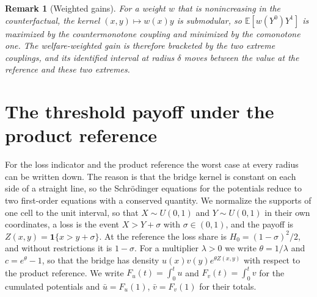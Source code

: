 \documentclass[11pt,a4paper]{article}
\theoremstyle{notesplain}
\theoremstyle{notesupright}
\newtheorem{remark}[theorem]{Remark}
\numberwithin{equation}{section}
\newcommand{\E}{\mathbb{E}}
\begin{document}
\begin{remark}[Weighted gains]
For a weight $w$ that is nonincreasing in the counterfactual, the kernel $(x,y)\mapsto w(x)y$ is submodular, so $\E[w(Y^0)Y^1]$ is maximized by the countermonotone coupling and minimized by the comonotone one. The welfare-weighted gain is therefore bracketed by the two extreme couplings, and its identified interval at radius $\delta$ moves between the value at the reference and these two extremes.
\end{remark}

\section{The threshold payoff under the product reference}
\label{sec:exact}
For the loss indicator and the product reference the worst case at every radius can be written down. The reason is that the bridge kernel is constant on each side of a straight line, so the Schrödinger equations for the potentials reduce to two first-order equations with a conserved quantity. We normalize the supports of one cell to the unit interval, so that $X\sim U(0,1)$ and $Y\sim U(0,1)$ in their own coordinates, a loss is the event $X>Y+\sigma$ with $\sigma\in(0,1)$, and the payoff is $Z(x,y)=\mathbf 1\{x>y+\sigma\}$. At the reference the loss share is $H_0=(1-\sigma)^2/2$, and without restrictions it is $1-\sigma$. For a multiplier $\lambda>0$ we write $\theta=1/\lambda$ and $c=e^\theta-1$, so that the bridge has density $u(x)v(y)e^{\theta Z(x,y)}$ with respect to the product reference. We write $F_u(t)=\int_0^tu$ and $F_v(t)=\int_0^tv$ for the cumulated potentials and $\bar u=F_u(1)$, $\bar v=F_v(1)$ for their totals.
\end{document}
